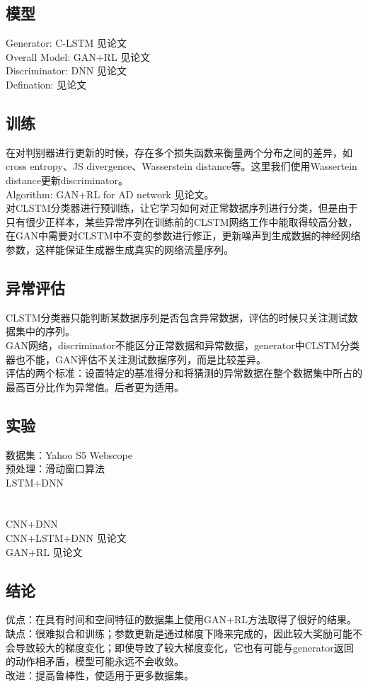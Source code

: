 \documentclass[11pt,a4paper]{ctexart}
\begin{document}
\subsection{模型}
\noindent Generator: C-LSTM 见论文\\
Overall Model: GAN+RL 见论文\\
Discriminator: DNN 见论文\\
Defination: 见论文
\subsection{训练}
\noindent 在对判别器进行更新的时候，存在多个损失函数来衡量两个分布之间的差异，如cross entropy、JS divergence、Wasserstein distance等。这里我们使用Wassertein distance更新discriminator。\\
Algorithm: GAN+RL for AD network 见论文。\\
对CLSTM分类器进行预训练，让它学习如何对正常数据序列进行分类，但是由于只有很少正样本，某些异常序列在训练前的CLSTM网络工作中能取得较高分数，在GAN中需要对CLSTM中不变的参数进行修正，更新噪声到生成数据的神经网络参数，这样能保证生成器生成真实的网络流量序列。
\subsection{异常评估}
\noindent CLSTM分类器只能判断某数据序列是否包含异常数据，评估的时候只关注测试数据集中的序列。\\
GAN网络，discriminator不能区分正常数据和异常数据，generator中CLSTM分类器也不能，GAN评估不关注测试数据序列，而是比较差异。\\
评估的两个标准：设置特定的基准得分和将猜测的异常数据在整个数据集中所占的最高百分比作为异常值。后者更为适用。
\subsection{实验}
\noindent 数据集：Yahoo S5 Webscope\\
预处理：滑动窗口算法\\
LSTM+DNN\\\\\\
CNN+DNN\\
CNN+LSTM+DNN 见论文\\
GAN+RL 见论文
\subsection{结论}
\noindent 优点：在具有时间和空间特征的数据集上使用GAN+RL方法取得了很好的结果。\\
缺点：很难拟合和训练；参数更新是通过梯度下降来完成的，因此较大奖励可能不会导致较大的梯度变化；即使导致了较大梯度变化，它也有可能与generator返回的动作相矛盾，模型可能永远不会收敛。\\
改进：提高鲁棒性，使适用于更多数据集。
\end{document}
